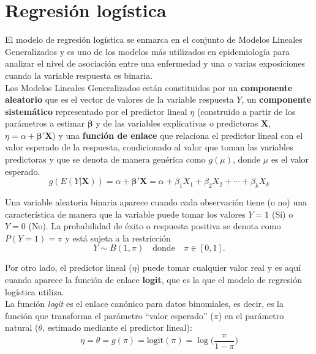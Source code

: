 \section{Regresión logística}\label{cap:logistica}
El modelo de regresión logística se enmarca en el conjunto de Modelos Lineales Generalizados y es uno de los modelos más utilizados en epidemiología para analizar el nivel de asociación entre una enfermedad y una o varias exposiciones cuando la variable respuesta es binaria. \\

Los Modelos Lineales Generalizados están constituidos por un \textbf{componente aleatorio} que es el vector de valores de la variable respuesta \textbf{$Y$}, un \textbf{componente sistemático} representado por el predictor lineal $\eta$  (construido a partir de los parámetros a estimar $\boldsymbol{\beta}$ y de las variables explicativas o predictoras  $\boldsymbol{X}$, $\eta =  \alpha+ \boldsymbol{\beta'X}$) y una \textbf{función de enlace} que relaciona el predictor lineal con el valor esperado de la respuesta, condicionado al valor que toman las variables predictoras y que se denota de manera genérica como $g(\mu)$, donde $\mu$ es el valor esperado.
\begin{equation}
\label{eq:reg}
g(E(Y|\boldsymbol{X})) =\alpha+ \boldsymbol{\beta'X} = \alpha+ \beta_1X_1 + \beta_2X_2 + \cdots + \beta_kX_k
\end{equation}

Una variable aleatoria binaria aparece cuando cada observación tiene (o no) una característica de manera que la variable puede tomar los valores $Y=1$ (Sí) o $Y=0$ (No). La probabilidad de éxito o respuesta positiva se denota como $P(Y=1)= \pi$ y está sujeta a la restricción
\begin{equation*}
Y \sim B(1,\pi) \quad \text{donde} \quad \pi \in [0,1].
\end{equation*}

Por otro lado, el predictor lineal ($\eta$) puede tomar cualquier valor real y es aquí cuando aparece la función de enlace \textbf{logit}, que es la que el modelo de regresión logística utiliza. \\

La función \textit{logit} es el enlace canónico para datos binomiales, es decir, es la función que transforma el parámetro ``valor esperado'' ($\pi$) en el parámetro natural ($\theta$, estimado mediante el predictor lineal):
\begin{equation*}
\eta = \theta = g(\pi)=\text{logit}(\pi) = \log \Big( \frac{\pi}{1-\pi} \Big)
\end{equation*}

